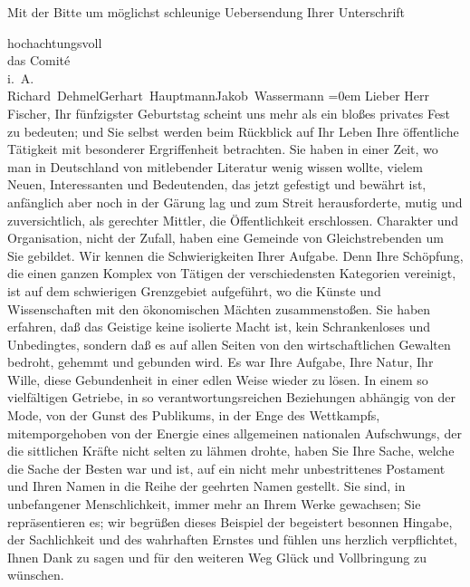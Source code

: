 \pstart
           Mit der Bitte um möglichst schleunige Uebersendung Ihrer Unterschrift\pend
           
\pstart
           hochachtungsvoll{\\[\baselineskip]}das Comité{\\[\baselineskip]}i. A.{\\[\baselineskip]}\spacefill\mbox{Richard Dehmel\hspace*{1.5em}Gerhart Hauptmann\hspace*{1.5em}Jakob Wassermann}\pend
           \leftskip=0em{}\vspace{1em}
\pstart{}{\pb}Lieber Herr Fischer,\pend\vspace{0.5em}
\pstart
           Ihr fünfzigster Geburtstag scheint uns mehr als ein bloßes privates Fest zu bedeuten;
               und Sie selbst werden beim Rückblick auf Ihr Leben Ihre öffentliche Tätigkeit mit
               besonderer Ergriffenheit betrachten. Sie haben in einer Zeit, wo man in Deutschland von mitlebender Literatur wenig wissen
               wollte, vielem Neuen, Interessanten und Bedeutenden, das jetzt gefestigt und bewährt
               ist, anfänglich aber noch in der Gärung lag und zum Streit herausforderte, mutig und
               zuversichtlich, als gerechter Mittler, die Öffentlichkeit erschlossen. Charakter und
               Organisation, nicht der Zufall, haben eine Gemeinde von Gleichstrebenden um Sie
               gebildet. Wir kennen die Schwierigkeiten Ihrer Aufgabe. Denn Ihre Schöpfung, die
               einen ganzen Komplex von Tätigen der verschiedensten Kategorien vereinigt, ist auf
               dem schwierigen Grenzgebiet aufgeführt, wo die Künste und Wissenschaften mit den
               ökonomischen Mächten zusammenstoßen. Sie haben erfahren, daß das Geistige keine
               isolierte Macht ist, kein Schrankenloses und Unbedingtes, sondern daß es auf allen
               Seiten von den wirtschaftlichen Gewalten bedroht, gehemmt und gebunden wird. Es war
               Ihre Aufgabe, Ihre Natur, Ihr Wille, {\pb}diese Gebundenheit in einer edlen Weise wieder zu lösen. In einem so vielfältigen
               Getriebe, in so verantwortungsreichen Beziehungen abhängig von der Mode, von der
               Gunst des Publikums, in der Enge des Wettkampfs, mitemporgehoben von der Energie
               eines allgemeinen nationalen Aufschwungs, der die sittlichen Kräfte nicht selten zu
               lähmen drohte, haben Sie Ihre Sache, welche die Sache der Besten war und ist, auf ein
               nicht mehr unbestrittenes Postament und Ihren Namen in die Reihe der geehrten Namen
               gestellt. Sie sind, in unbefangener Menschlichkeit, immer mehr an Ihrem Werke
               gewachsen; Sie repräsentieren es; wir begrüßen dieses Beispiel der begeistert
               besonnen Hingabe, der Sachlichkeit und des wahrhaften Ernstes und fühlen uns herzlich
               verpflichtet, Ihnen Dank zu sagen und für den weiteren Weg Glück und Vollbringung zu
               wünschen.\pend
           
